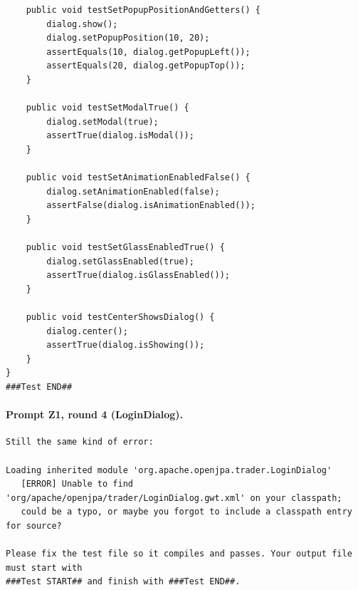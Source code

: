 \begin{lstlisting}
    public void testSetPopupPositionAndGetters() {
        dialog.show();
        dialog.setPopupPosition(10, 20);
        assertEquals(10, dialog.getPopupLeft());
        assertEquals(20, dialog.getPopupTop());
    }

    public void testSetModalTrue() {
        dialog.setModal(true);
        assertTrue(dialog.isModal());
    }

    public void testSetAnimationEnabledFalse() {
        dialog.setAnimationEnabled(false);
        assertFalse(dialog.isAnimationEnabled());
    }

    public void testSetGlassEnabledTrue() {
        dialog.setGlassEnabled(true);
        assertTrue(dialog.isGlassEnabled());
    }

    public void testCenterShowsDialog() {
        dialog.center();
        assertTrue(dialog.isShowing());
    }
}
###Test END##
\end{lstlisting}

\paragraph*{Prompt Z1, round 4 (LoginDialog).}
\label{prompt:ld-z1-r4}
\begin{lstlisting}
Still the same kind of error:

Loading inherited module 'org.apache.openjpa.trader.LoginDialog'
   [ERROR] Unable to find 'org/apache/openjpa/trader/LoginDialog.gwt.xml' on your classpath;
   could be a typo, or maybe you forgot to include a classpath entry for source?

Please fix the test file so it compiles and passes. Your output file must start with
###Test START## and finish with ###Test END##.
\end{lstlisting}


